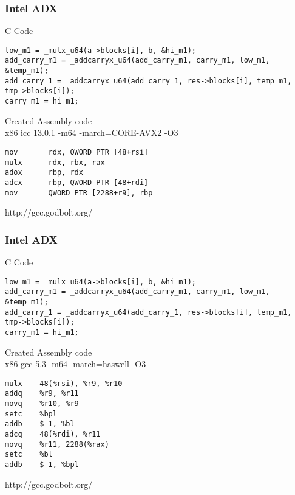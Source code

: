 \begin{frame}[fragile]
\frametitle{Intel ADX}
C Code
\begin{lstlisting}[frame=single, basicstyle=\tiny]
low_m1 = _mulx_u64(a->blocks[i], b, &hi_m1); 
add_carry_m1 = _addcarryx_u64(add_carry_m1, carry_m1, low_m1, &temp_m1);
add_carry_1 = _addcarryx_u64(add_carry_1, res->blocks[i], temp_m1, tmp->blocks[i]);
carry_m1 = hi_m1;
\end{lstlisting}
Created Assembly code\\
x86 icc 13.0.1 -m64 -march=CORE-AVX2 -O3
\begin{lstlisting}[frame=single, basicstyle=\tiny, language={[x86masm]Assembler}]
mov       rdx, QWORD PTR [48+rsi]
mulx      rdx, rbx, rax
adox      rbp, rdx
adcx      rbp, QWORD PTR [48+rdi]
mov       QWORD PTR [2288+r9], rbp 
\end{lstlisting}
\vfill
\tiny{http://gcc.godbolt.org/}
\end{frame}

\begin{frame}[fragile]
\frametitle{Intel ADX}
C Code
\begin{lstlisting}[frame=single, basicstyle=\tiny]
low_m1 = _mulx_u64(a->blocks[i], b, &hi_m1); 
add_carry_m1 = _addcarryx_u64(add_carry_m1, carry_m1, low_m1, &temp_m1);
add_carry_1 = _addcarryx_u64(add_carry_1, res->blocks[i], temp_m1, tmp->blocks[i]);
carry_m1 = hi_m1;
\end{lstlisting}
Created Assembly code\\
x86 gcc 5.3 -m64 -march=haswell -O3
\begin{lstlisting}[frame=single, basicstyle=\tiny, language={[x86masm]Assembler}]
mulx    48(%rsi), %r9, %r10
addq    %r9, %r11
movq    %r10, %r9
setc    %bpl
addb    $-1, %bl
adcq    48(%rdi), %r11
movq    %r11, 2288(%rax)
setc    %bl
addb    $-1, %bpl
\end{lstlisting}
\vfill
\tiny{http://gcc.godbolt.org/}
\end{frame}


